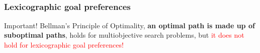 \subsection{\texorpdfstring{\lexgo}{\lexgo}}
\begin{frame}
\frametitle{Lexicographic goal preferences}
	\begin{alertblock}{Important!}
		\vspace{1mm}
		Bellman's Principle of Optimality, \textbf{an optimal path is made up of suboptimal paths}, holds for multiobjective search problems, but \textcolor{red}{it does not hold for lexicographic goal preferences!}
		\vspace{1mm}
	\end{alertblock}
\end{frame}
